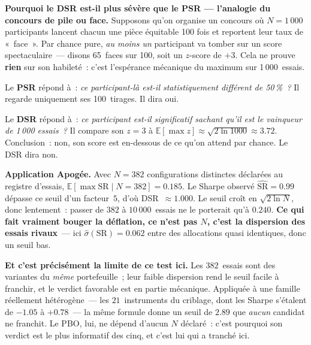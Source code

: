 \begin{examplebox}
\textbf{Pourquoi le DSR est-il plus sévère que le PSR --- l'analogie du concours de pile ou face.} Supposons qu'on organise un concours où $N=1\,000$ participants lancent chacun une pièce équitable 100 fois et reportent leur taux de «~face~». Par chance pure, \emph{au moins un} participant va tomber sur un score spectaculaire~--- disons 65~faces sur 100, soit un $z$-score de $+3$. Cela ne prouve \textbf{rien} sur son habileté~: c'est l'espérance mécanique du maximum sur 1\,000~essais.

\smallskip
Le \textbf{PSR} répond à~: \emph{ce participant-là est-il statistiquement différent de 50\,\%~?} Il regarde uniquement ses 100~tirages. Il dira oui.

\smallskip
Le \textbf{DSR} répond à~: \emph{ce participant est-il significatif sachant qu'il est le vainqueur de 1\,000 essais~?} Il compare son $z=3$ à $\mathbb{E}[\max z] \approx \sqrt{2\ln 1000} \approx 3.72$. Conclusion~: non, son score est en-dessous de ce qu'on attend par chance. Le DSR dira non.

\smallskip
\textbf{Application Apogée.} Avec $N=382$ configurations distinctes déclarées au registre d'essais, $\mathbb{E}[\max \mathrm{SR}\mid N=382] = 0.185$. Le Sharpe observé $\widehat{\mathrm{SR}}=0.99$ dépasse ce seuil d'un facteur~$5$, d'où DSR~$\approx 1.000$. Le seuil croît en $\sqrt{2\ln N}$, donc lentement~: passer de $382$ à $10\,000$~essais ne le porterait qu'à $0.240$. \textbf{Ce qui fait vraiment bouger la déflation, ce n'est pas $N$, c'est la dispersion des essais rivaux}~--- ici $\widehat{\sigma}(\mathrm{SR}) = 0.062$ entre des allocations quasi identiques, donc un seuil bas.

\smallskip
\textbf{Et c'est précisément la limite de ce test ici.} Les $382$~essais sont des variantes du \emph{même} portefeuille~; leur faible dispersion rend le seuil facile à franchir, et le verdict favorable est en partie mécanique. Appliquée à une famille réellement hétérogène~--- les $21$~instruments du criblage, dont les Sharpe s'étalent de $-1.05$ à $+0.78$~--- la même formule donne un seuil de $2.89$ que \emph{aucun} candidat ne franchit. Le PBO, lui, ne dépend d'aucun $N$ déclaré~: c'est pourquoi son verdict est le plus informatif des cinq, et c'est lui qui a tranché ici.
\end{examplebox}

